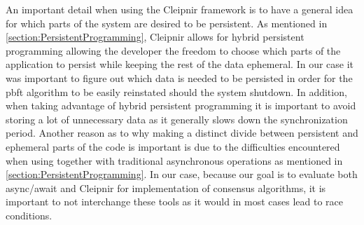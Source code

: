 
\iffalse
\label{sec:persvsephe}
An important detail when using the Cleipnir framework is to have a general idea for which parts of the system are desired to be persistent. As mentioned in \autoref{section:PersistentProgramming}, Cleipnir allows for hybrid persistent programming allowing the developer the freedom to choose which parts of the application to persist while keeping the rest of the data ephemeral. In our case it was important to figure out which data is needed to be persisted in order for the \ac{pbft} algorithm to be easily reinstated should the system shutdown. In addition, when taking advantage of hybrid persistent programming it is important to avoid storing a lot of unnecessary data as it generally slows down the synchronization period. Another reason as to why making a distinct divide between persistent and ephemeral parts of the code is important is due to the difficulties encountered when using  together with traditional asynchronous operations as mentioned in \autoref{section:PersistentProgramming}. In our case, because our goal is to evaluate both async/await and Cleipnir for implementation of consensus algorithms, it is important to not interchange these tools as it would in most cases lead to race conditions.

